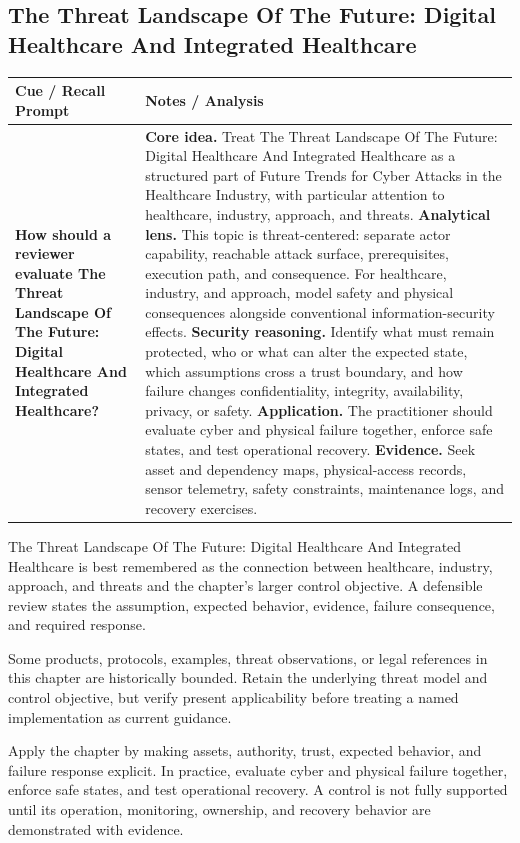 \documentclass[11pt]{article}
\newcommand{\CornellHeader}{%
\rowcolor{Navy}\color{white}\bfseries Cue / Recall Prompt & \color{white}\bfseries Notes / Analysis\\\hline}
\newcommand{\CornellRow}[2]{%
\cellcolor{CueGray}\RaggedRight\textbf{#1} & \RaggedRight #2\\\hline}
\begin{document}
\subsection*{The Threat Landscape Of The Future: Digital Healthcare And Integrated Healthcare}
\begin{longtable}{>{\RaggedRight\arraybackslash}p{}|>{\RaggedRight\arraybackslash}p{}}
\CornellHeader
\CornellRow{How should a reviewer evaluate The Threat Landscape Of The Future: Digital Healthcare And Integrated Healthcare?}{\textbf{Core idea.} Treat The Threat Landscape Of The Future: Digital Healthcare And Integrated Healthcare as a structured part of Future Trends for Cyber Attacks in the Healthcare Industry, with particular attention to healthcare, industry, approach, and threats. \textbf{Analytical lens.} This topic is threat-centered: separate actor capability, reachable attack surface, prerequisites, execution path, and consequence. For healthcare, industry, and approach, model safety and physical consequences alongside conventional information-security effects. \textbf{Security reasoning.} Identify what must remain protected, who or what can alter the expected state, which assumptions cross a trust boundary, and how failure changes confidentiality, integrity, availability, privacy, or safety. \textbf{Application.} The practitioner should evaluate cyber and physical failure together, enforce safe states, and test operational recovery. \textbf{Evidence.} Seek asset and dependency maps, physical-access records, sensor telemetry, safety constraints, maintenance logs, and recovery exercises.}
\end{longtable}
\begin{topicsummary}
The Threat Landscape Of The Future: Digital Healthcare And Integrated Healthcare is best remembered as the connection between healthcare, industry, approach, and threats and the chapter's larger control objective. A defensible review states the assumption, expected behavior, evidence, failure consequence, and required response.
\end{topicsummary}
\begin{historybox}
Some products, protocols, examples, threat observations, or legal references in this chapter are historically bounded. Retain the underlying threat model and control objective, but verify present applicability before treating a named implementation as current guidance.
\end{historybox}
\begin{defensebox}
Apply the chapter by making assets, authority, trust, expected behavior, and failure response explicit. In practice, evaluate cyber and physical failure together, enforce safe states, and test operational recovery. A control is not fully supported until its operation, monitoring, ownership, and recovery behavior are demonstrated with evidence.
\end{defensebox}
\end{document}
